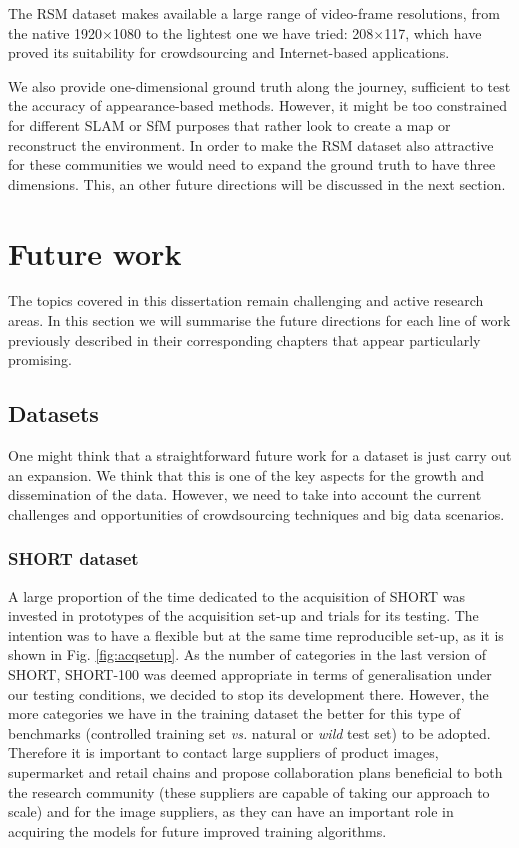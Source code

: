 The RSM dataset makes available a large range of video-frame resolutions, from the native 1920$\times$1080 to the lightest one we have tried: 208$\times$117, which have proved its suitability for crowdsourcing and Internet-based applications.

We also provide one-dimensional ground truth along the journey, sufficient to test the accuracy of appearance-based methods. However, it might be too constrained for different SLAM or SfM purposes that rather look to create a map or reconstruct the environment. In order to make the RSM dataset also attractive for these communities we would need to expand the ground truth to have three dimensions. This, an other future directions will be discussed in the next section.

\section{Future work}
\label{sec:futurework}

The topics covered in this dissertation remain challenging and active research areas. In this section we will summarise the future directions for each line of work previously described in their corresponding chapters that appear particularly promising.

\subsection{Datasets}

One might think that a straightforward future work for a dataset is just carry out an expansion. We think that this is one of the key aspects for the growth and dissemination of the data. However, we need to take into account the current challenges and opportunities of crowdsourcing techniques and big data scenarios.

\subsubsection{SHORT dataset}

A large proportion of the time dedicated to the acquisition of SHORT was invested in prototypes of the acquisition set-up and trials for its testing. The intention was to have a flexible but at the same time reproducible set-up, as it is shown in Fig. \ref{fig:acqsetup}. As the number of categories in the last version of SHORT, SHORT-100 was deemed appropriate in terms of generalisation under our testing conditions, we decided to stop its development there. However, the more categories we have in the training dataset the better for this type of benchmarks (controlled training set \textit{vs.} natural or \textit{wild} test set) to be adopted. Therefore it is important to contact large suppliers of product images, supermarket and retail chains and propose collaboration plans beneficial to both the research community (these suppliers are capable of taking our approach to scale) and for the image suppliers, as they can have an important role in acquiring the models for future improved training algorithms.

